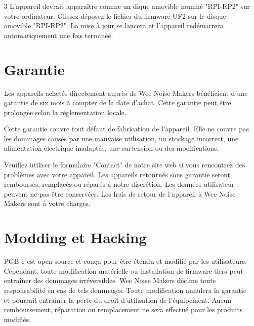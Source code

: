 \documentclass[8pt]{extarticle}
\def\device{PGB-1 }
\def\WNM{Wee Noise Makers }
\begin{document}
\begin{multicols*}{3}
L'appareil devrait apparaître comme un dique amovible nommé "RPI-RP2" sur votre ordinateur. Glissez-déposez le fichier du firmware UF2 sur le disque amovible "RPI-RP2". La mise à jour se lancera et l'appareil redémarrera automatiquement une fois terminée.

\section{Garantie}

Les appareils achetés directement auprès de \WNM bénéficient d'une garantie de six mois à compter de la date d'achat. Cette garantie peut être prolongée selon la réglementation locale.

Cette garantie couvre tout défaut de fabrication de l'appareil. Elle ne couvre pas les dommages causés par une mauvaise utilisation, un stockage incorrect, une alimentation électrique inadaptée, une surtension ou des modifications.

Veuillez utiliser le formulaire "Contact" de notre site web si vous rencontrez des problèmes avec votre appareil. Les appareils retournés sous garantie seront remboursés, remplacés ou réparés à notre discrétion. Les données utilisateur peuvent ne pas être conservées. Les frais de retour de l'appareil à \WNM sont à votre charges.

\section{Modding et Hacking}

\device est open source et conçu pour être étendu et modifié par les utilisateurs. Cependant, toute modification matérielle ou installation de firmware tiers peut entraîner des dommages irréversibles. \WNM décline toute responsabilité en cas de tels dommages. Toute modification annulera la garantie et pourrait entraîner la perte du droit d'utilisation de l'équipement. Aucun remboursement, réparation ou remplacement ne sera effectué pour les produits modifiés.


\end{multicols*}
\end{document}
